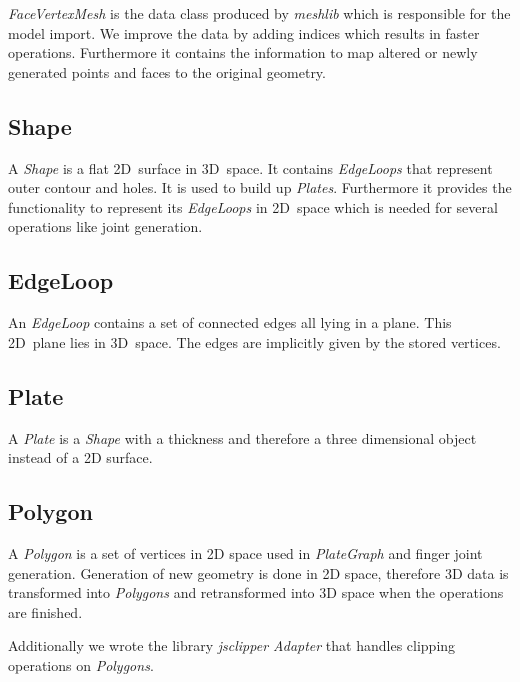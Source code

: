 \documentclass[../ClassicThesis.tex]{subfiles}
\begin{document}
\emph{FaceVertexMesh} is the data class produced by \emph{meshlib} which is responsible for the model import. We improve the data by adding indices which results in faster operations. Furthermore it contains the information to map altered or newly generated points and faces to the original geometry.

\subsection*{Shape}

A \emph{Shape} is a flat 2D~surface in 3D~space. It contains \emph{EdgeLoops} that represent outer contour and holes. It is used to build up \emph{Plates}. Furthermore it provides the functionality to represent its \emph{EdgeLoops} in 2D~space which is needed for several operations like joint generation.

\subsection*{EdgeLoop}

An \emph{EdgeLoop} contains a set of connected edges all lying in a plane. This 2D~plane lies in 3D~space. The edges are implicitly given by the stored vertices.

\subsection*{Plate}

A \emph{Plate} is a \emph{Shape} with a thickness and therefore a three dimensional object instead of a 2D surface.

\subsection*{Polygon}

A \emph{Polygon} is a set of vertices in 2D space used in \emph{PlateGraph} and finger joint generation. Generation of new geometry is done in 2D space, therefore 3D data is transformed into \emph{Polygons} and retransformed into 3D space when the operations are finished. 

Additionally we wrote the library \emph{jsclipper Adapter} that handles clipping operations on \emph{Polygons}.
\end{document}
